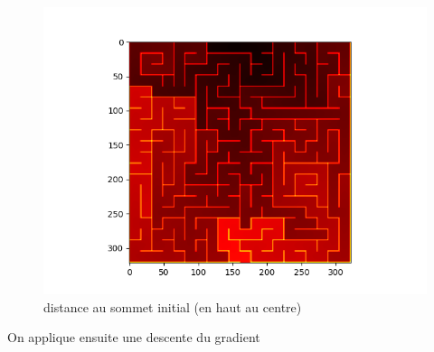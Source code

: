 \documentclass{article}
\begin{document}
\begin{figure}[h]
	\begin{center}
		\includegraphics[scale=0.55]{../result/maze_T.png}
		\caption{distance au sommet initial (en haut au centre)}
	\end{center}
\end{figure}

On applique ensuite une descente du gradient
\end{document}
